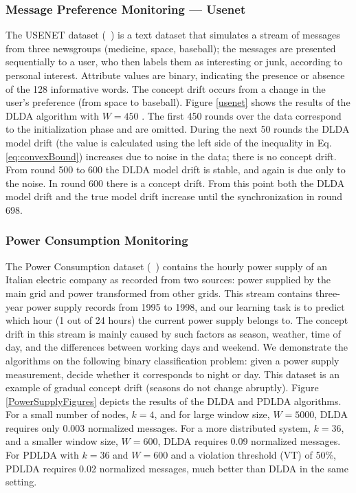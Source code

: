 \documentclass{vldb}
\begin{document}
\subsubsection{Message Preference Monitoring --- Usenet}
The USENET dataset (~\citealt{usenet}) is a text dataset that simulates a stream of messages from three newsgroups (medicine, space, baseball); the messages are presented sequentially to a user, who then labels them as interesting or junk, according to personal interest. Attribute values are binary, indicating the presence or absence of the 128 informative words. The concept drift occurs from a change in the user's preference (from space to baseball). 
Figure \ref{usenet} shows the results of the DLDA algorithm with $W=450$ . The first 450 rounds over the data correspond to
the initialization phase and are omitted. During the next 50 rounds the DLDA model drift (the value is calculated using the left side of the inequality in Eq. \ref{eq:convexBound}) increases due to noise in the data; there is
no concept drift. From round 500 to 600 the DLDA model drift is stable,
and again is due only to the noise. In round 600 there is a concept
drift.
From this point both the DLDA model drift and the true model drift increase until the synchronization in round 698.
\subsubsection{Power Consumption Monitoring}
The Power Consumption dataset  (~\citealt{powerSupply}) contains the hourly power supply of an
Italian electric company as recorded from two sources: power supplied
by the main grid and power transformed from other grids.
This stream contains three-year power supply records
from 1995 to 1998, and our learning task is to predict which hour (1 out of 24 hours) the current power supply belongs to. The concept drift in this stream
is mainly caused by such factors as season, weather, time of day,
and the differences between working days and weekend.
We demonstrate the algorithms on the following binary classification problem:
given a power supply measurement, decide whether it corresponds to night or day.
This dataset is an example of gradual concept drift (seasons do not
change abruptly).
Figure \ref{PowerSupplyFigures} depicts the results of the DLDA
and PDLDA algorithms. For a small number of nodes, $k=4$, and for large
window size, $W=5000$, DLDA requires only 0.003 normalized messages.
For a more distributed system, $k=36$, and a smaller window
size, $W=600$, DLDA requires 0.09 normalized messages. For PDLDA with
$k=36$ and $W=600$ and a violation threshold (VT) of 50\%, PDLDA
requires 0.02 normalized messages, much better than DLDA in the same setting.
\end{document}
